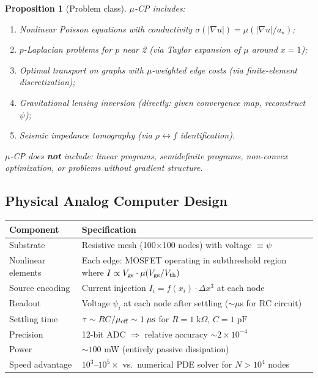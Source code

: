 \documentclass[11pt]{article}
\newtheorem{proposition}[theorem]{Proposition}
\theoremstyle{definition}
\theoremstyle{remark}
\newcommand{\ee}[1]{\times 10^{#1}}
\newcommand{\astar}{a_\star}
\begin{document}
\begin{proposition}[Problem class]
$\mu$-CP includes:
\begin{enumerate}
  \item Nonlinear Poisson equations with conductivity $\sigma(|\nabla u|)
    = \mu(|\nabla u|/\astar)$;
  \item $p$-Laplacian problems for $p$ near 2 (via Taylor expansion of
    $\mu$ around $x = 1$);
  \item Optimal transport on graphs with $\mu$-weighted edge costs
    (via finite-element discretization);
  \item Gravitational lensing inversion (directly: given convergence map,
    reconstruct $\psi$);
  \item Seismic impedance tomography (via $\rho \leftrightarrow f$
    identification).
\end{enumerate}
$\mu$-CP does \textbf{not} include: linear programs, semidefinite
programs, non-convex optimization, or problems without gradient structure.
\end{proposition}

\subsection{Physical Analog Computer Design}

\begin{center}
\begin{tabular}{p{3cm}p{9cm}}
\toprule
\textbf{Component} & \textbf{Specification} \\
\midrule
Substrate & Resistive mesh (100$\times$100 nodes) with voltage $\equiv \psi$ \\
Nonlinear elements & Each edge: MOSFET operating in subthreshold
  region where $I \propto V_{\rm gs} \cdot \mu(V_{\rm gs}/V_{\rm th})$ \\
Source encoding & Current injection $I_i = f(x_i) \cdot \Delta x^3$
  at each node \\
Readout & Voltage $\psi_i$ at each node after settling ($\sim \mu$s
  for RC circuit) \\
Settling time & $\tau \sim RC/\mu_{\rm eff} \sim 1\;\mu\text{s}$
  for $R = 1\;\text{k}\Omega$, $C = 1\;\text{pF}$ \\
Precision & 12-bit ADC $\Rightarrow$ relative accuracy $\sim 2 \ee{-4}$ \\
Power & $\sim 100$ mW (entirely passive dissipation) \\
Speed advantage & $10^3$--$10^5 \times$ vs.\ numerical PDE solver
  for $N > 10^4$ nodes \\
\bottomrule
\end{tabular}
\end{center}
\end{document}
